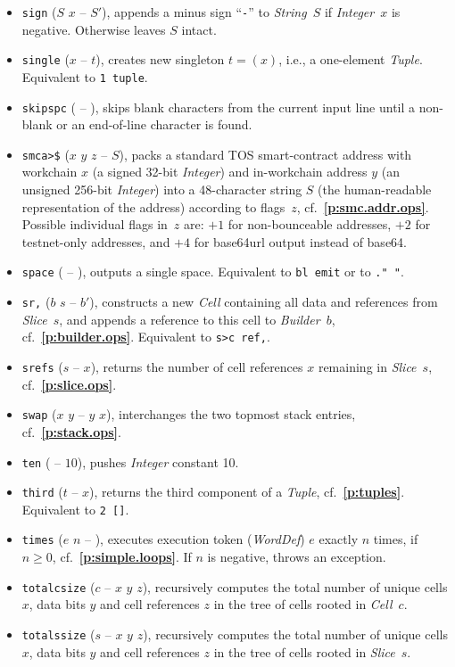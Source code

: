 \documentclass[12pt,oneside]{article}
\def\refpoint#1{{\rm\textbf{\ref{#1}}}}
\let\ptref=\refpoint
\begin{document}
\begin{itemize}
\item {\tt sign} ($S$ $x$ -- $S'$), appends a minus sign ``{\tt -}'' to {\em String\/}~$S$ if {\em Integer\/}~$x$ is negative. Otherwise leaves $S$ intact.
\item {\tt single} ($x$ -- $t$), creates new singleton $t=(x)$, i.e., a one-element {\em Tuple}. Equivalent to {\tt 1 tuple}.
\item {\tt skipspc} ( -- ), skips blank characters from the current input line until a non-blank or an end-of-line character is found.
\item {\tt smca>\$} ($x$ $y$ $z$ -- $S$), packs a standard TOS smart-contract address with workchain $x$ (a signed 32-bit {\em Integer\/}) and in-workchain address $y$ (an unsigned 256-bit {\em Integer\/}) into a 48-character string $S$ (the human-readable representation of the address) according to flags~$z$, cf.~\ptref{p:smc.addr.ops}. Possible individual flags in~$z$ are: $+1$ for non-bounceable addresses, $+2$ for testnet-only addresses, and $+4$ for base64url output instead of base64.
\item {\tt space} ( -- ), outputs a single space. Equivalent to {\tt bl emit} or to {\tt ." "}.
\item {\tt sr,} ($b$ $s$ -- $b'$), constructs a new {\em Cell\/} containing all data and references from {\em Slice\/}~$s$, and appends a reference to this cell to {\em Builder}~$b$, cf.~\ptref{p:builder.ops}. Equivalent to {\tt s>c ref,}.
\item {\tt srefs} ($s$ -- $x$), returns the number of cell references $x$ remaining in {\em Slice}~$s$, cf.~\ptref{p:slice.ops}.
\item {\tt swap} ($x$ $y$ -- $y$ $x$), interchanges the two topmost stack entries, cf.~\ptref{p:stack.ops}.
\item {\tt ten} ( -- $10$), pushes {\em Integer\/} constant 10.
\item {\tt third} ($t$ -- $x$), returns the third component of a {\em Tuple}, cf.~\ptref{p:tuples}. Equivalent to {\tt 2 []}.
\item {\tt times} ($e$ $n$ -- ), executes execution token ({\em WordDef\/}) $e$ exactly $n$ times, if $n\geq0$, cf.~\ptref{p:simple.loops}. If $n$ is negative, throws an exception.
\item {\tt totalcsize} ($c$ -- $x$ $y$ $z$), recursively computes the total number of unique cells $x$, data bits $y$ and cell references $z$ in the tree of cells rooted in {\em Cell\/}~$c$.
\item {\tt totalssize} ($s$ -- $x$ $y$ $z$), recursively computes the total number of unique cells $x$, data bits $y$ and cell references $z$ in the tree of cells rooted in {\em Slice\/}~$s$.

\end{itemize}
\end{document}
